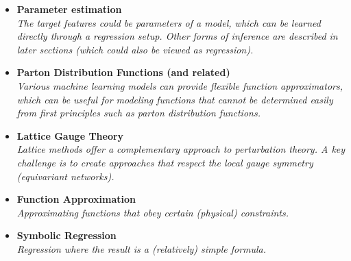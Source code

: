 \documentclass[12pt,letterpaper]{article}
\begin{document}
\begin{itemize}
\begin{itemize}
		\item \textbf{Parameter estimation}~\cite{Lei:2020ucb,1808105,Lazzarin:2020uvv,Kim:2021pcz,Alda:2021rgt,Craven:2021ems,Castro:2022zpq,Meng:2022lmd,Garg:2022tal,Qiu:2023ihi,AlHammal:2023svo,Shi:2023xfz,Goos:2023opq}
		\\\textit{The target features could be parameters of a model, which can be learned directly through a regression setup.  Other forms of inference are described in later sections (which could also be viewed as regression).}
		\item \textbf{Parton Distribution Functions (and related)}~\cite{DelDebbio:2020rgv,Grigsby:2020auv,Rossi:2020sbh,Carrazza:2021hny,Ball:2021leu,Ball:2021xlu,Khalek:2021gon,Iranipour:2022iak,Gao:2022uhg,Gao:2022srd,Candido:2023utz,Wang:2023nab,Kassabov:2023hbm,Wang:2023poi,Fernando:2023obn,Rabemananjara:2023xfq}
		\\\textit{Various machine learning models can provide flexible function approximators, which can be useful for modeling functions that cannot be determined easily from first principles such as parton distribution functions.}
		\item \textbf{Lattice Gauge Theory}~\cite{Kanwar:2003.06413,Favoni:2020reg,Bulusu:2021rqz,Shi:2021qri,Hackett:2021idh,Yoon:2018krb,Zhang:2019qiq,Nguyen:2019gpo,Favoni:2021epq,Chen:2021jey,Bulusu:2021njs,Shi:2022yqw,Luo:2022jzl,Chen:2022ytr,Li:2022ozl,Kang:2022jbg,Albandea:2022fky,Khan:2022vot,Sale:2022snt,Kim:2022rna,Karsch:2022yka,Favoni:2022mcg,Chen:2022asj,Bacchio:2022vje,Bacchio:2022vje,Gao:2022uhg,Aguilar:2022thg,Lawrence:2022dba,Peng:2022wdl,Lehner:2023bba,Albandea:2023wgd,Nicoli:2023qsl,Aronsson:2023rli,Zhou:2023pti,Hudspith:2023loy,R:2023dcr,Bender:2023gwr,NarcisoFerreira:2023kak,Lehner:2023prf,Riberdy:2023awf,Buzzicotti:2023qdv,Caselle:2023mvh}
		\\\textit{Lattice methods offer a complementary approach to perturbation theory.  A key challenge is to create approaches that respect the local gauge symmetry (equivariant networks).}
		\item \textbf{Function Approximation}~\cite{1853982,Haddadin:2021mmo,Chahrour:2021eiv,Wang:2021jou,Kitouni:2021fkh,Lei:2022dvn,Wang:2023nab,Fernando:2023obn}
		\\\textit{Approximating functions that obey certain (physical) constraints.}
		\item \textbf{Symbolic Regression}~\cite{Butter:2021rvz,Zhang:2022uqk,Lu:2022joy,Wang:2023poi}
		\\\textit{Regression where the result is a (relatively) simple formula.}

\end{itemize}
\end{itemize}
\end{document}
